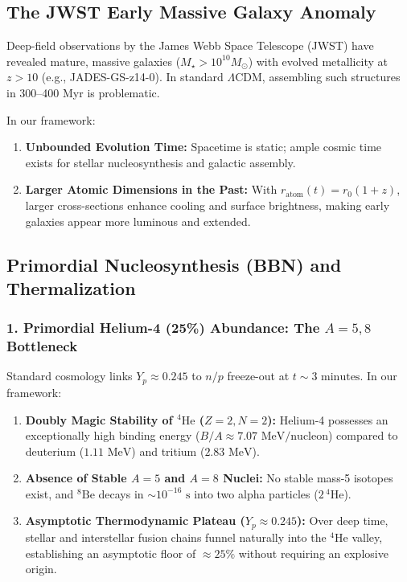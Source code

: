 \subsection{The JWST Early Massive Galaxy Anomaly}
Deep-field observations by the James Webb Space Telescope (JWST) have revealed mature, massive galaxies ($M_\star > 10^{10} M_\odot$) with evolved metallicity at $z > 10$ (e.g., JADES-GS-z14-0). In standard $\Lambda$CDM, assembling such structures in 300--400 Myr is problematic.

In our framework:
\begin{enumerate}
    \item \textbf{Unbounded Evolution Time:} Spacetime is static; ample cosmic time exists for stellar nucleosynthesis and galactic assembly.
    \item \textbf{Larger Atomic Dimensions in the Past:} With $r_{\mathrm{atom}}(t) = r_0 (1+z)$, larger cross-sections enhance cooling and surface brightness, making early galaxies appear more luminous and extended.
\end{enumerate}

\subsection{Primordial Nucleosynthesis (BBN) and Thermalization}
\label{sec:bbn_ve_termalizasyon}

\subsubsection{1. Primordial Helium-4 (25\%) Abundance: The $A=5, 8$ Bottleneck}
Standard cosmology links $Y_p \approx 0.245$ to $n/p$ freeze-out at $t \sim 3\text{ minutes}$. In our framework:
\begin{enumerate}
    \item \textbf{Doubly Magic Stability of $^4\mathrm{He}$ ($Z=2, N=2$):} Helium-4 possesses an exceptionally high binding energy ($B/A \approx 7.07\text{ MeV/nucleon}$) compared to deuterium ($1.11\text{ MeV}$) and tritium ($2.83\text{ MeV}$).
    \item \textbf{Absence of Stable $A=5$ and $A=8$ Nuclei:} No stable mass-5 isotopes exist, and $^8\mathrm{Be}$ decays in $\sim 10^{-16}\text{ s}$ into two alpha particles ($2 \, ^4\mathrm{He}$).
    \item \textbf{Asymptotic Thermodynamic Plateau ($Y_p \approx 0.245$):} Over deep time, stellar and interstellar fusion chains funnel naturally into the $^4\mathrm{He}$ valley, establishing an asymptotic floor of $\approx 25\%$ without requiring an explosive origin.
\end{enumerate}

